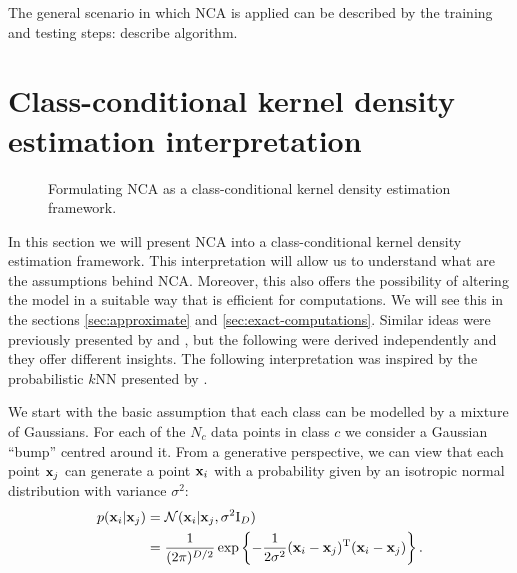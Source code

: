 	The general scenario in which NCA is applied can be described by the training and testing steps:
	describe algorithm.
	
\section{Class-conditional kernel density estimation interpretation}
\label{sec:cc-kde}
	
	\begin{figure}
	  \centering
	  \caption{Formulating NCA as a class-conditional kernel density estimation
	framework.}
	  \label{fig:kde}
	\end{figure}
	
	In this section we will present NCA into a class-conditional kernel density
	estimation framework. This interpretation will allow us to understand what are
	the assumptions behind NCA. Moreover, this also offers the possibility of
	altering the model in a suitable way that is efficient for computations. We will
	see this in the sections \ref{sec:approximate} and \ref{sec:exact-computations}.
	Similar ideas were previously presented by and , but the following were derived
	independently and they offer different insights. The following interpretation
	was inspired by the probabilistic $k$NN presented by \citet{barber2011}.
	
	We start with the basic assumption that each class can be modelled by a mixture
	of Gaussians. For each of the $N_c$ data points in class $c$ we consider a
	Gaussian ``bump'' centred around it. From a generative perspective, we can view
	that each point $\mathbf{x}_j$ can generate a point $\mathbf{x}_i$ with a probability given by
	an isotropic normal distribution with variance $\sigma^2$:
	\begin{align}
	    p(\mathbf{x}_i|\mathbf{x}_j) &= \mathcal{N}(\mathbf{x}_i|\mathbf{x}_j, \sigma^2\mathrm{I}_D) \\
	                   &= \frac{1}{(2\pi)^{D/2}}\exp \left\{-\frac{1}{2\sigma^2}
	(\mathbf{x}_i - \mathbf{x}_j)^\mathrm{T}(\mathbf{x}_i - \mathbf{x}_j)\right\}.
	\end{align}
	
